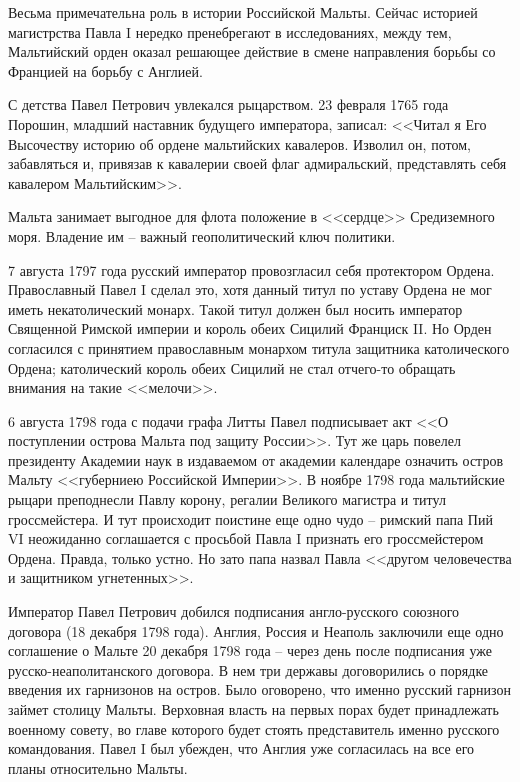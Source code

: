 \documentclass[a4paper,12pt]{diss_4}
\begin{document}
Весьма примечательна роль в истории Российской Мальты. Сейчас историей магистрства Павла I нередко пренебрегают в исследованиях, между тем, Мальтийский орден оказал решающее действие в смене направления борьбы со Францией на борьбу с Англией.

С детства Павел Петрович увлекался рыцарством. 23 февраля 1765 года Порошин, младший наставник будущего императора, записал: <<Читал я Его Высочеству историю об ордене мальтийских кавалеров. Изволил он, потом, забавляться и, привязав к кавалерии своей флаг адмиральский, представлять себя кавалером Мальтийским>>.

Мальта занимает выгодное для флота положение в <<сердце>> Средиземного моря. Владение им -- важный геополитический ключ политики. 

7 августа 1797 года русский император провозгласил себя протектором Ордена. Православный Павел I сделал это, хотя данный титул по уставу Ордена не мог иметь некатолический монарх. Такой титул должен был носить император Священной Римской империи и король обеих Сицилий Франциск II. Но Орден согласился с принятием православным монархом титула защитника католического Ордена; католический король обеих Сицилий не стал отчего-то обращать внимания на такие <<мелочи>>.

6 августа 1798 года с подачи графа Литты Павел подписывает акт <<О поступлении острова Мальта под защиту России>>. Тут же царь повелел президенту Академии наук  в издаваемом от академии календаре означить остров Мальту <<губерниею Российской Империи>>. В ноябре 1798 года мальтийские рыцари преподнесли Павлу корону, регалии Великого магистра и титул гроссмейстера. И тут происходит поистине еще одно чудо -- римский папа Пий VI неожиданно соглашается с просьбой Павла I признать его гроссмейстером Ордена. Правда, только устно. Но зато папа назвал Павла <<другом человечества и защитником угнетенных>>.

Император Павел Петрович добился подписания англо-русского союзного договора (18 декабря 1798 года). Англия, Россия и Неаполь заключили еще одно соглашение о Мальте 20 декабря 1798 года -- через день после подписания уже русско-неаполитанского договора. В нем три державы договорились о порядке введения их гарнизонов на остров. Было оговорено, что именно русский гарнизон займет столицу Мальты. Верховная власть на первых порах будет принадлежать военному совету, во главе которого будет стоять представитель именно русского командования. Павел I был убежден, что Англия уже согласилась на все его планы относительно Мальты. 
\end{document}
